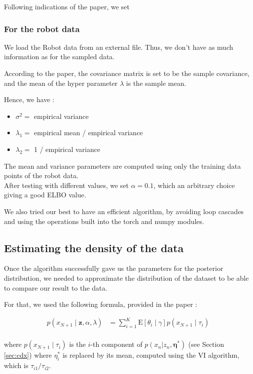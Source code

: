 \documentclass{article}
\begin{document}
Following indications of the paper, we set $$$$

\subsubsection{For the robot data}
We load the Robot data from an external file. Thus, we don't have as much information as for the sampled data.

According to the paper, the covariance matrix is set to be the sample covariance, and the mean of the hyper parameter $\lambda$ is the
sample mean.

Hence, we have :

\begin{itemize}
    \item $\sigma^2 = $ empirical variance
    \item $\lambda_1 =$ empirical mean / empirical variance
    \item $\lambda_2 =$ 1 / empirical variance
\end{itemize}

The mean and variance parameters are computed using only the training data points of the robot data. \\

After testing with different values, we set $\alpha = 0.1$, which an arbitrary choice giving a good ELBO value.

We also tried our best to have an efficient algorithm, by avoiding loop cascades and using the operations built into the torch and numpy modules.

\subsection{Estimating the density of the data}\label{sec:est}

Once the algorithm successfully gave us the parameters for the posterior distribution, we needed to approximate the distribution of the dataset to be able to compare our result to the data.

For that, we used the following formula, provided in the paper :

\begin{align*}
p\left(x_{N+1} \mid \mathbf{z}, \alpha, \lambda\right) &= \sum_{i=1}^K \mathrm{E}\left[\theta_i \mid \gamma\right] p\left(x_{N+1} \mid \tau_i\right) \\
\end{align*}

where $p\left(x_{N+1} \mid \tau_i\right)$ is the $i$-th component of $\left.p\left(x_n\right| z_n, \boldsymbol{\eta}^*\right)$ (see Section \ref{sec:cdx}) where $\eta_i^*$ is replaced by its mean, computed using the VI algorithm, which is $\tau_{i 1} / \tau_{i 2}$.
\end{document}
